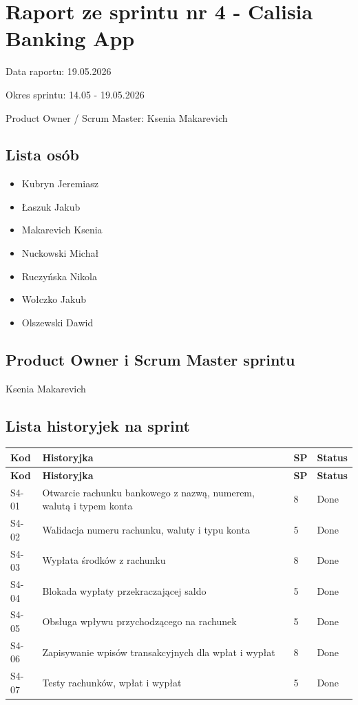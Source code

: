 \documentclass[12pt,a4paper]{article}
\begin{document}
\section*{Raport ze sprintu nr 4 - Calisia Banking App}
Data raportu: 19.05.2026

Okres sprintu: 14.05 - 19.05.2026

Product Owner / Scrum Master: Ksenia Makarevich

\subsection*{Lista osób}
\begin{itemize}
\item Kubryn Jeremiasz
\item Łaszuk Jakub
\item Makarevich Ksenia
\item Nuckowski Michał
\item Ruczyńska Nikola
\item Wołczko Jakub
\item Olszewski Dawid
\end{itemize}

\subsection*{Product Owner i Scrum Master sprintu}
Ksenia Makarevich

\subsection*{Lista historyjek na sprint}
\begingroup
\footnotesize
{}
\begin{longtable}{@{}C{0.08\textwidth}L{0.62\textwidth}C{0.10\textwidth}L{0.12\textwidth}@{}}
\toprule
{}
\textbf{Kod} & \textbf{Historyjka} & \textbf{SP} & \textbf{Status} \\
\midrule
\endfirsthead
\toprule
{}
\textbf{Kod} & \textbf{Historyjka} & \textbf{SP} & \textbf{Status} \\
\midrule
\endhead
S4-01 & Otwarcie rachunku bankowego z nazwą, numerem, walutą i typem konta & 8 & Done \\
S4-02 & Walidacja numeru rachunku, waluty i typu konta & 5 & Done \\
S4-03 & Wypłata środków z rachunku & 8 & Done \\
S4-04 & Blokada wypłaty przekraczającej saldo & 5 & Done \\
S4-05 & Obsługa wpływu przychodzącego na rachunek & 5 & Done \\
S4-06 & Zapisywanie wpisów transakcyjnych dla wpłat i wypłat & 8 & Done \\
S4-07 & Testy rachunków, wpłat i wypłat & 5 & Done \\
\bottomrule
\end{longtable}
\endgroup
\end{document}
